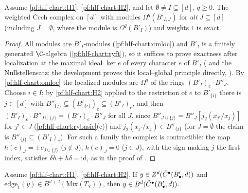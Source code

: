 \begin{lemma}\label{pf:hlf-chart:rowex}
Assume \ref{pf:hlf-chart:H1}, \ref{pf:hlf-chart:H2}, and let $\emptyset\ne I\subseteq[d]$, $q\ge0$. The weighted \v{C}ech complex on $[d]$ with modules
$\Omega^q(B'_{I,J})$ for \emph{all} $J\subseteq[d]$ (including $J=\emptyset$, where the module is $\Omega^q(B'_I)$) and weights $1$ is exact.
\end{lemma}

\begin{proof}
All modules are $B'_I$-modules (\cref{pf:hlf-chart:omloc}) and $B'_I$ is a finitely generated $\C$-algebra (\cref{pf:hlf-chart:ryft}), so it suffices to
prove exactness after localization at the maximal ideal $\ker e$ of every character $e$ of $B'_I$
(\cite[Prop.~3.9]{AtiyahMacdonald1969} and the Nullstellensatz; the development proves this local--global principle directly,
). By \cref{pf:hlf-chart:omloc} the localized modules are $\Omega^q$ of the rings
$(B'_I)_e\cdot B''_J$. Choose $i\in I$; by \ref{pf:hlf-chart:H2} applied to the restriction of $e$ to $B'_{\{i\}}$ there is $j\in[d]$ with
$B''_{\{j\}}\subseteq(B'_{\{i\}})_e\subseteq(B'_I)_e$, and then $(B'_I)_e\cdot B''_{J\cup\{j\}}=(B'_I)_e\cdot B''_J$ for all $J$, since
$B''_{J\cup\{j\}}=B''_J[j_2(x_{j'}/x_j)]$ for $j'\in J$ (\cref{pf:hlf-chart:rybasic}(c)) and $j_2(x_{j'}/x_j)\in B''_{\{j\}}$ (for $J=\emptyset$ the
claim is $B''_{\{j\}}\subseteq(B'_I)_e$). For such a family the complex is contractible: the map $h(c)_J=\pm c_{J\cup\{j\}}$ ($j\notin J$),
$h(c)_J=0$ ($j\in J$), with the sign making $j$ the first index, satisfies $\delta h+h\delta=\mathrm{id}$, as in the proof of
\cite[III, Lemma~4.2]{Hartshorne1977}.
\end{proof}

\begin{lemma}\label{pf:hlf-chart:edgeb}
Assume \ref{pf:hlf-chart:H1}, \ref{pf:hlf-chart:H2}. If $y\in Z^d(\check{C}^\bullet(B'_\bullet,d))$ and $\mathrm{edge}_1(y)\in B^{d+2}(\mathrm{Mix}(T_Y))$, then
$y\in B^d(\check{C}^\bullet(B'_\bullet,d))$.
\end{lemma}

